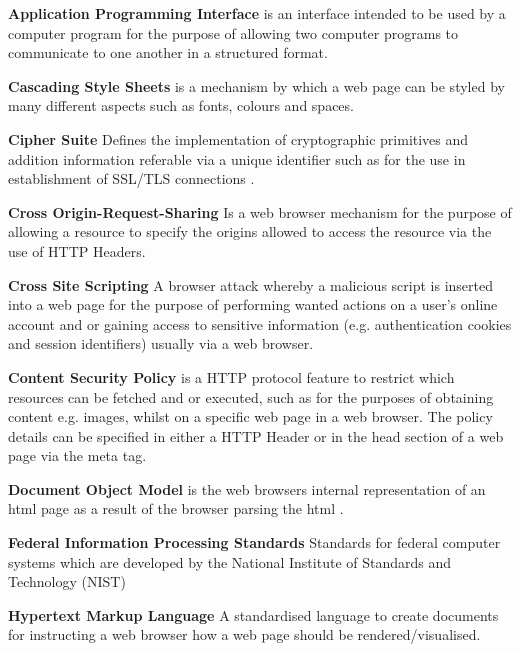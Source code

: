 \documentclass{mscreport}
\begin{document}
\begin{hangparas}{.25in}{1}
\textbf{Application Programming Interface} is an interface intended to be used by a computer program for the purpose of allowing two computer programs to communicate to one another in a structured format. \par
\vspace{0.5cm}
\textbf{Cascading Style Sheets} is a mechanism by which a web page can be styled by many different aspects such as fonts, colours and spaces. \par
\textbf{Cipher Suite} Defines the implementation of cryptographic primitives and addition information referable via a unique identifier such as  for the use in establishment of SSL/TLS connections \cite{Ristic2017-aj}. \par
\textbf{Cross Origin-Request-Sharing} Is a web browser mechanism for the purpose of allowing a resource to specify the origins allowed to access the resource via the use of HTTP Headers. \par
\textbf{Cross Site Scripting} A browser attack whereby a malicious script is inserted into a web page for the purpose of performing wanted actions on a user’s online account and or gaining access to sensitive information (e.g. authentication cookies and session identifiers) usually via a web browser. \par
\textbf{Content Security Policy} is a HTTP protocol feature to restrict which resources can be fetched and or executed, such as for the purposes of obtaining content e.g. images, whilst on a specific web page in a web browser. The policy details can be specified in either a HTTP Header or in the head section of a web page via the meta tag. \par
\vspace{0.5cm}
\textbf{Document Object Model} is the web browsers internal representation of an html page as a result of the browser parsing the html \cite{Apple_undated-ay}. \par
\vspace{0.5cm}
\textbf{Federal Information Processing Standards} Standards for federal computer systems which are developed by the National Institute of Standards and Technology (NIST) \par
\vspace{0.5cm}
\textbf{Hypertext Markup Language} A standardised language to create documents \cite{Berners-Lee1995-hg} for instructing a web browser how a web page should be rendered/visualised. \par

\end{hangparas}
\end{document}
